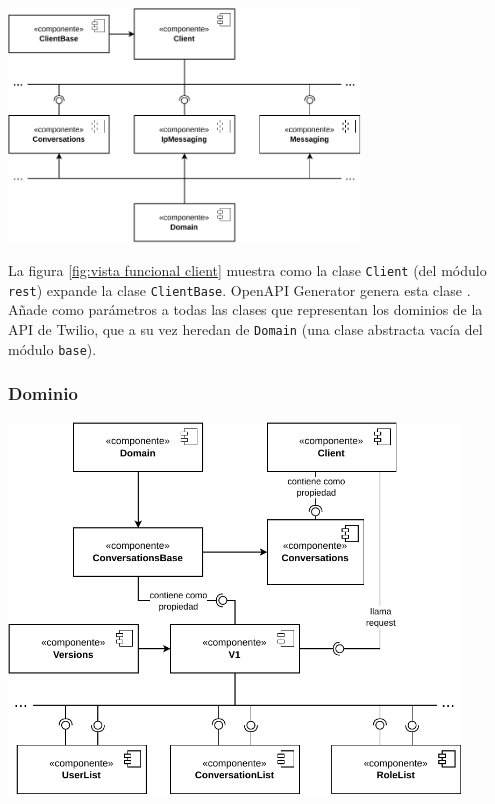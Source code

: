 \documentclass{article}
\begin{document}
\begin{center}
  \includegraphics[width=0.7\textwidth]{VistaFuncionalCliente.pdf}
  \label{fig:vista funcional client}
\end{center}

\hfill

La figura \ref{fig:vista funcional client}
muestra como la clase \verb|Client|
(del módulo \verb|rest|)
expande la clase \verb|ClientBase|.
OpenAPI Generator genera esta clase
\cite{twilio-generated-openapi}.
Añade como parámetros a todas las clases
que representan los dominios de la API de Twilio,
que a su vez heredan de \verb|Domain|
(una clase abstracta vacía del módulo \verb|base|).

\subsubsection{Dominio}

\hfill

\begin{center}
  \includegraphics[width=0.9\textwidth]{VistaFuncionalDominio.pdf}
  \label{fig:vista funcional dominio}
\end{center}
\end{document}
